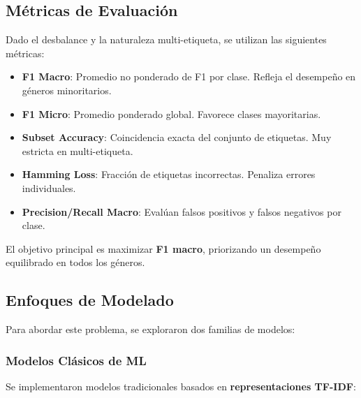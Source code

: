 \subsection{Métricas de Evaluación}

Dado el desbalance y la naturaleza multi-etiqueta, se utilizan las siguientes métricas:

\begin{itemize}
    \item \textbf{F1 Macro}: Promedio no ponderado de F1 por clase. Refleja el desempeño en géneros minoritarios.
    \item \textbf{F1 Micro}: Promedio ponderado global. Favorece clases mayoritarias.
    \item \textbf{Subset Accuracy}: Coincidencia exacta del conjunto de etiquetas. Muy estricta en multi-etiqueta.
    \item \textbf{Hamming Loss}: Fracción de etiquetas incorrectas. Penaliza errores individuales.
    \item \textbf{Precision/Recall Macro}: Evalúan falsos positivos y falsos negativos por clase.
\end{itemize}

El objetivo principal es maximizar \textbf{F1 macro}, priorizando un desempeño equilibrado en todos los géneros.

\subsection{Enfoques de Modelado}

Para abordar este problema, se exploraron dos familias de modelos:

\subsubsection{Modelos Clásicos de ML}

Se implementaron modelos tradicionales basados en \textbf{representaciones TF-IDF}:

